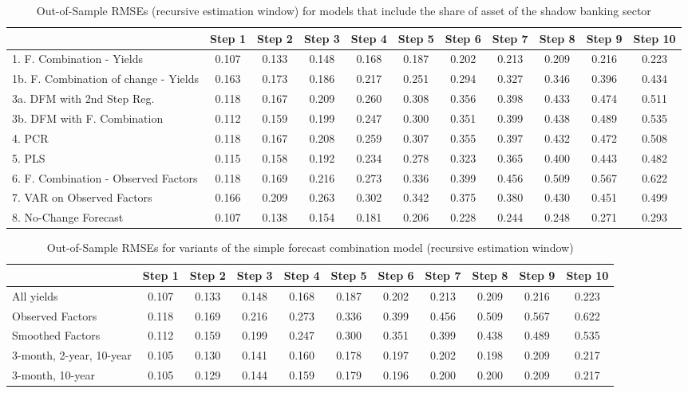 \documentclass[11pt]{article}
\begin{document}
\begin{table}
\caption{Out-of-Sample RMSEs (recursive estimation window) for models that include the share of asset of the shadow banking sector} \label{table_rmse_competition}
\center
\begin{tabular}{|l|c|c|c|c|c|c|c|c|c|c|}
\hline
&Step 1 &Step 2 &Step 3 &Step 4 &Step 5 &Step 6 &Step 7 &Step 8 &Step 9 &Step 10\\
\hline
1. F. Combination - Yields           &0.107&0.133&0.148&0.168&0.187&0.202&0.213&0.209&0.216&0.223\\
1b. F. Combination of change - Yields&0.163&0.173&0.186&0.217&0.251&0.294&0.327&0.346&0.396&0.434\\
3a. DFM with 2nd Step Reg.           &0.118&0.167&0.209&0.260&0.308&0.356&0.398&0.433&0.474&0.511\\
3b. DFM with F. Combination          &0.112&0.159&0.199&0.247&0.300&0.351&0.399&0.438&0.489&0.535\\
4. PCR                               &0.118&0.167&0.208&0.259&0.307&0.355&0.397&0.432&0.472&0.508\\
5. PLS                               &0.115&0.158&0.192&0.234&0.278&0.323&0.365&0.400&0.443&0.482\\
6. F. Combination - Observed Factors &0.118&0.169&0.216&0.273&0.336&0.399&0.456&0.509&0.567&0.622\\
7. VAR on Observed Factors           &0.166&0.209&0.263&0.302&0.342&0.375&0.380&0.430&0.451&0.499\\
8. No-Change Forecast                &0.107&0.138&0.154&0.181&0.206&0.228&0.244&0.248&0.271&0.293\\\hline
\end{tabular}
\end{table}


\clearpage
\begin{table}
\caption{Out-of-Sample RMSEs for variants of the simple forecast combination model (recursive estimation window)} \label{table_rmse_combination}
\center
\begin{tabular}{|l|c|c|c|c|c|c|c|c|c|c|}
\hline
&Step 1 &Step 2 &Step 3 &Step 4 &Step 5 &Step 6 &Step 7 &Step 8 &Step 9 &Step 10\\
\hline
All yields              &0.107&0.133&0.148&0.168&0.187&0.202&0.213&0.209&0.216&0.223\\
Observed Factors        &0.118&0.169&0.216&0.273&0.336&0.399&0.456&0.509&0.567&0.622\\
Smoothed Factors        &0.112&0.159&0.199&0.247&0.300&0.351&0.399&0.438&0.489&0.535\\
3-month, 2-year, 10-year&0.105&0.130&0.141&0.160&0.178&0.197&0.202&0.198&0.209&0.217\\
3-month, 10-year        &0.105&0.129&0.144&0.159&0.179&0.196&0.200&0.200&0.209&0.217\\
\hline
\end{tabular}
\end{table}
\end{document}
